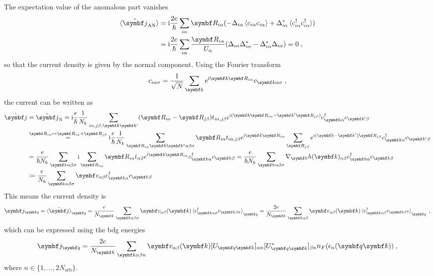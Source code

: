 \documentclass[../main.tex]{subfiles}
\begin{document}
The expectation value of the anomalous part vanishes
\begin{align}
	\braket{\ope{\vb{j}}_{\mathrm{AN}}} &= \iu \frac{2 e}{\hbar} \sum_{i\alpha} \vb{R}_{i \alpha} (-\Delta_{i \alpha} \braket{c_{i \alpha} c_{i \alpha}} + \Delta_{i \alpha}^* \braket{c_{i \alpha}^{\dagger} c_{i \alpha}^{\dagger}}) \\
	&= \iu \frac{2 e}{\hbar} \sum_{i\alpha} \frac{\vb{R}_{i \alpha}}{U_{\alpha}} (\Delta_{i \alpha} \Delta_{i \alpha}^* - \Delta_{i \alpha}^* \Delta_{i \alpha}) = 0 \;,
\end{align}
so that the current density is given by the normal component.
Using the Fourier transform
\begin{equation}
	c_{i \alpha \sigma} = \frac{1}{\sqrt{N}} \sum_{\vb{k}} e^{\iu \vb{k} \vb{R}_{i \alpha}} c_{\vb{k} \alpha \sigma} \;,
\end{equation}
the current can be written as
\begin{align}
	\ope{\vb{j}} &= \ope{\vb{j}}_{\mathrm{N}} = \iu \frac{e}{\hbar} \frac{1}{N_k} \sum_{i\alpha, j\beta, \vb{k} \vb{k}^{\prime}} (\vb{R}_{i \alpha} - \vb{R}_{j \beta}) t_{i \alpha, j \beta} e^{\iu (\vb{k} \vb{R}_{i \alpha} - \vb{k}^{\prime} \vb{R}_{j \beta})} c_{\vb{k} \alpha}^{\dagger} c_{\vb{k}^{\prime} \beta} \\
	&\overset{\vb{R}_{i \alpha} \mapsto \vb{R}_{i \alpha} + \vb{R}_{j \beta}}{=} \iu \frac{e}{\hbar} \frac{1}{N_k} \sum_{\vb{R}_{i \alpha} \vb{k} \vb{k}^{\prime} \alpha \beta \sigma} \vb{R}_{i \alpha} t_{i \alpha, j \beta} e^{\iu \vb{k} \vb{R}_{i \alpha}} \sum_{\vb{R}_{j \beta}} e^{\iu (\vb{k} - \vb{k}^{\prime}) \vb{R}_{j \beta}} c_{\vb{k} \alpha}^{\dagger} c_{\vb{k}^{\prime} \beta} \\
	&= \frac{e}{\hbar N_k} \sum_{\vb{k} \alpha \beta \sigma} \iu \sum_{\vb{R}_{i \alpha}} \vb{R}_{i \alpha} t_{\alpha \beta} e^{\iu \vb{k} \vb{R}_{i \alpha}} c_{\vb{k} \alpha}^{\dagger} c_{\vb{k} \beta} = \frac{e}{\hbar N_k} \sum_{\vb{k} \alpha \beta \sigma} \nabla_{\vb{k}} h(\vb{k})_{\alpha \beta} c_{\vb{k} \alpha}^{\dagger} c_{\vb{k} \beta} \\
	&\coloneq \frac{e}{N_k} \sum_{\vb{k} \alpha \beta \sigma} \vb{v}_{\alpha \beta} c_{\vb{k} \alpha}^{\dagger} c_{\vb{k} \beta}
\end{align}
This means the current density is
\begin{align}
	\vb{j}_{\vb{q}} = \braket{\ope{\vb{j}}}_{\vb{q}} = \frac{e}{N_{\vb{k}}} \sum_{\vb{k} \alpha \beta \sigma} \vb{v}_{\alpha \beta} (\vb{k}) \braket{c_{\vb{k} \alpha \sigma}^{\dagger} c_{\vb{k} \beta \sigma}}_{\vb{q}} = \frac{2 e}{N_{\vb{k}}} \sum_{\vb{k} \alpha \beta} \vb{v}_{\alpha \beta} (\vb{k}) \braket{c_{\vb{k} \alpha \uparrow}^{\dagger} c_{\vb{k} \beta \uparrow}}_{\vb{q}} \label{eq:current density general} \;,
\end{align}
which can be expressed using the \gls{bdg} energies
\begin{align}
	\vb{j}_{\vb{q}} = \frac{2 e}{N_{\vb{k}}} \sum_{\vb{k} \alpha \beta n} \vb{v}_{\alpha \beta} (\vb{k}) [U_{\vb{q} \vb{k}}]_{\alpha n} [U_{\vb{q} \vb{k}}^*]_{\beta n} n_F (\epsilon_n (\vb{q} \vb{k})) \;,
\end{align}
where \(n \in \{1, \ldots, 2 N_{\mathrm{orb}}\}\).
\end{document}
